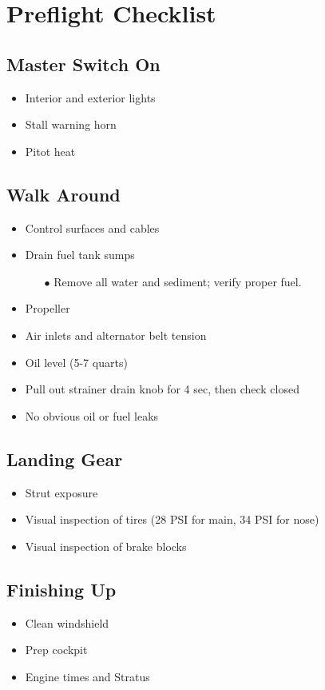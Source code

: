 \def\todoitem#1{
    \item[$\square$] #1 \dotfill
}

\section{Preflight Checklist}

\subsection{Master Switch On}

\begin{itemize}
    \todoitem{Interior and exterior lights}
    \todoitem{Stall warning horn}
    \todoitem{Pitot heat}
\end{itemize}

\subsection{Walk Around}

\begin{itemize}
    \todoitem{Control surfaces and cables}
    \todoitem{Drain fuel tank sumps}
    \begin{itemize}
        \item[$\bullet$] Remove all water and sediment; verify proper fuel.
    \end{itemize}
    \todoitem{Propeller}
    \todoitem{Air inlets and alternator belt tension}
    \todoitem{Oil level (5-7 quarts)}
    \todoitem{Pull out strainer drain knob for 4 sec, then check closed}
    \todoitem{No obvious oil or fuel leaks}
\end{itemize}

\subsection{Landing Gear}

\begin{itemize}
    \todoitem{Strut exposure}
    \todoitem{Visual inspection of tires (28 PSI for main, 34 PSI for nose)}
    \todoitem{Visual inspection of brake blocks}
\end{itemize}

\subsection{Finishing Up}

\begin{itemize}
    \todoitem{Clean windshield}
    \todoitem{Prep cockpit}
    \todoitem{Engine times and Stratus}
\end{itemize}
